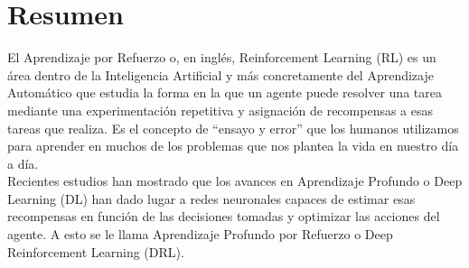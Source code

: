 \documentclass[11pt,fleqn]{book} %
\begin{document}




\pagestyle{empty} %

\tableofcontents %

\usechapterimagefalse

\listoffigures %

\cleardoublepage %

\pagestyle{fancy} %


\section{Resumen}\label{sec:resumen}

El Aprendizaje por Refuerzo o, en inglés, Reinforcement Learning (RL) es un área dentro de la Inteligencia Artificial y más concretamente del Aprendizaje Automático que estudia la forma en la que un agente puede resolver una tarea mediante una experimentación repetitiva y asignación de recompensas a esas tareas que realiza. Es el concepto de ``ensayo y error'' que los humanos utilizamos para aprender en muchos de los problemas que nos plantea la vida en nuestro día a día. \\

Recientes estudios han mostrado que los avances en Aprendizaje Profundo o Deep Learning (DL) han dado lugar a redes neuronales capaces de estimar esas recompensas en función de las decisiones tomadas y optimizar las acciones del agente. A esto se le llama Aprendizaje Profundo por Refuerzo o Deep Reinforcement Learning (DRL). \\
\end{document}
